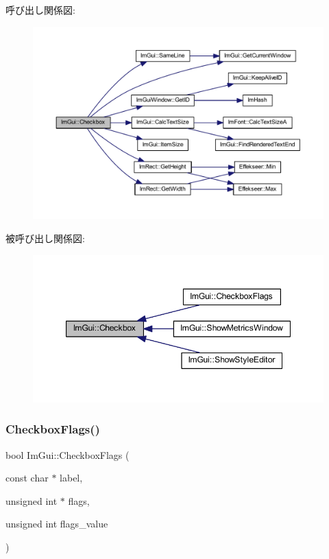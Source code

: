 呼び出し関係図\+:\nopagebreak
\begin{figure}[H]
\begin{center}
\leavevmode
\includegraphics[width=350pt]{namespace_im_gui_a57d73c1d0ef807fef734d91024092027_cgraph}
\end{center}
\end{figure}
被呼び出し関係図\+:\nopagebreak
\begin{figure}[H]
\begin{center}
\leavevmode
\includegraphics[width=347pt]{namespace_im_gui_a57d73c1d0ef807fef734d91024092027_icgraph}
\end{center}
\end{figure}
\mbox{\label{namespace_im_gui_aeca400dcf5a82c312b3e669d2fe6e88d}} 
\subsubsection{\texorpdfstring{Checkbox\+Flags()}{CheckboxFlags()}}
{\footnotesize\ttfamily bool Im\+Gui\+::\+Checkbox\+Flags (\begin{DoxyParamCaption}\item[{const char $\ast$}]{label,  }\item[{unsigned int $\ast$}]{flags,  }\item[{unsigned int}]{flags\+\_\+value }\end{DoxyParamCaption})}



